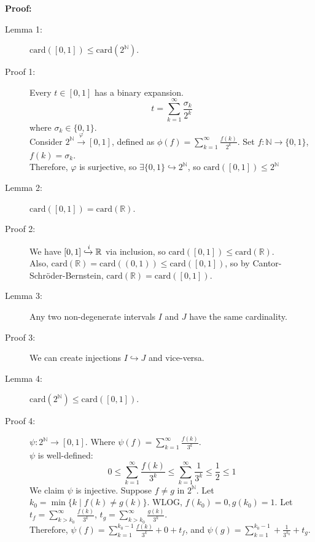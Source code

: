\documentclass[10pt]{extarticle}
\newcommand{\card}{\text{card}}
\newcommand{\N}{\mathbb{N}}
\newcommand{\R}{\mathbb{R}}
\begin{document}
      \textbf{Proof:}
    \begin{description}
      \item[Lemma 1:] $\card([0,1]) \leq \card(2^{\N})$.
      \item[Proof 1:] Every $t\in [0,1]$ has a binary expansion.
        \[
          t = \sum_{k = 1}^{\infty} \frac{\sigma_k}{2^k}
        \] 
        where $\sigma_k \in \{0,1\}$. \\

        Consider $2^{\N} \xrightarrow{\varphi} [0,1]$, defined as $\displaystyle \phi(f) = \sum_{k=1}^{\infty}\frac{f(k)}{2^k}$. Set $f: \N \rightarrow \{0,1\}$, $f(k) = \sigma_k$.\\

          Therefore, $\varphi$ is surjective, so $\exists \{0,1\}\hookrightarrow 2^{\N}$, so $\card([0,1]) \leq 2^{\N}$
        \item[Lemma 2:] $\card([0,1]) = \card(\R)$.
        \item[Proof 2:] We have $[0,1]\xhookrightarrow{i} \R$ via inclusion, so $\card([0,1])\leq \card(\R)$.\\

          Also, $\card(\R) = \card((0,1)) \leq \card([0,1])$, so by Cantor-Schröder-Bernstein, $\card(\R) = \card([0,1])$.
        \item[Lemma 3:] Any two non-degenerate intervals $I$ and $J$ have the same cardinality. 
        \item[Proof 3:] We can create injections $I\hookrightarrow J$ and vice-versa.
        \item[Lemma 4:] $\card(2^{\N}) \leq \card([0,1])$.
        \item[Proof 4:] $\psi: 2^{\N} \rightarrow [0,1]$. Where $\psi(f) = \sum_{k = 1}^{\infty}\frac{f(k)}{3^k}$.\\

          $\psi$ is well-defined:
          \[
            0\leq \sum_{k=1}^{\infty}\frac{f(k)}{3^k} \leq \sum_{k=1}^{\infty}\frac{1}{3^k} \leq \frac{1}{2} \leq 1
          \] 
          We claim $\psi$ is injective. Suppose $f\neq g$ in $2^{\N}$. Let $k_0 = \min\{k\mid f(k) \neq g(k)\}$. WLOG, $f(k_0) = 0, g(k_0) = 1$. Let $t_f = \sum_{k>k_0}^{\infty}\frac{f(k)}{3^k}$, $t_g = \sum_{k>k_0}^{\infty}\frac{g(k)}{3^k}$.\\

          Therefore, $\psi(f) = \sum_{k = 1}^{k_0-1}\frac{f(k)}{3^k} + 0 + t_f$, and $\psi(g) = \sum_{k=1}^{k_0-1} + \frac{1}{3^{k_0}} + t_g$.\\


\end{description}
\end{document}
